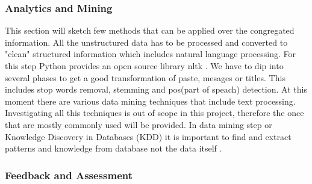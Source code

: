 \documentclass[12pt]{article}
\newcounter{subsubsubsection}[subsubsection]
\begin{document}
\subsubsection{Analytics and Mining}
This section will sketch few methods that can be applied over the congregated information. All the unstructured data has to be processed and converted to "clean" structured information which includes natural language processing. For this step Python provides an open source library nltk \cite{nltk}. We have to dip into several phases to get a good transformation of  paste, mesages or titles. This includes stop words removal, stemming and pos(part of speach) detection. 
At this moment there are various data mining techniques \cite{oracle-list} that include text processing. Investigating all this techniques is out of scope in this project, therefore the once that are mostly commonly used will be provided. In data mining step or Knowledge Discovery in Databases (KDD) it is important to find and extract patterns and knowledge from database not the data itself \cite{data-kdd}.
\subsubsection{Feedback and Assessment}
\end{document}
